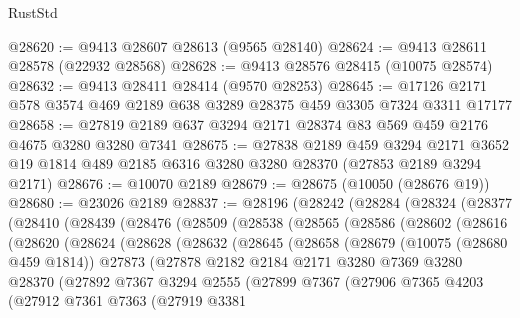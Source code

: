 \begin{lexlean}{RustStd}
\begin{coremodule}
@28620 := @9413 @28607 @28613 (@9565 @28140)
@28624 := @9413 @28611 @28578 (@22932 @28568)
@28628 := @9413 @28576 @28415 (@10075 @28574)
@28632 := @9413 @28411 @28414 (@9570 @28253)
@28645 := @17126 @2171 @578 @3574 @469 @2189 @638 @3289 @28375 @459 @3305 @7324 @3311 @17177
@28658 := @27819 @2189 @637 @3294 @2171 @28374 @83 @569 @459 @2176 @4675 @3280 @3280 @7341
@28675 := @27838
    @2189
    @459
    @3294
    @2171
    @3652
    @19
    @1814
    @489
    @2185
    @6316
    @3280
    @3280
    @28370
    (@27853 @2189 @3294 @2171)
@28676 := @10070 @2189
@28679 := @28675 (@10050 (@28676 @19))
@28680 := @23026 @2189
@28837 := @28196
    (@28242
      (@28284
        (@28324
          (@28377
            (@28410
              (@28439
                (@28476
                  (@28509
                    (@28538
                      (@28565
                        (@28586
                          (@28602
                            (@28616
                              (@28620
                                (@28624
                                  (@28628
                                    (@28632
                                      (@28645
                                        (@28658
                                          (@28679
                                            (@10075 (@28680 @459 @1814))
                                            @27873
                                            (@27878
                                              @2182
                                              @2184
                                              @2171
                                              @3280
                                              @7369
                                              @3280
                                              @28370
                                              (@27892
                                                @7367
                                                @3294
                                                @2555
                                                (@27899
                                                  @7367
                                                  (@27906
                                                    @7365
                                                    @4203
                                                    (@27912
                                                      @7361
                                                      @7363
                                                      (@27919
                                                        @3381

\end{coremodule}
\end{lexlean}
